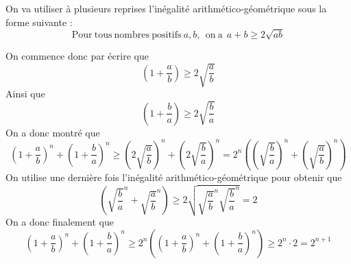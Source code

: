 \begin{sol}
On va utiliser à plusieurs reprises l'inégalité arithmético-géométrique sous la forme suivante :
$$\mathrm{Pour}\: \mathrm{tous}\: \mathrm{nombres}\: \mathrm{ positifs }\:a,b,\:\: \mathrm{on}\: \mathrm{a}\:\:a+b\ge 2\sqrt{ab} $$

On commence donc par écrire que
$$\left(1+\frac a b\right)\ge 2\sqrt{\frac a b} $$
Ainsi que
$$\left(1+\frac b a\right)\ge 2\sqrt{\frac b a} $$
On a donc montré que
$$\left(1+\frac a b\right)^n+\left(1+\frac b a\right)^n\ge \left(2\sqrt{\frac a b}\right)^n+\left(2\sqrt{\frac b a}\right)^n=2^n\left(\left(\sqrt{\frac b a}\right)^n+\left(\sqrt{\frac a b}\right)^n \right) $$
On utilise une dernière fois l'inégalité arithmético-géométrique pour obtenir que
$$\left(\sqrt{\frac b a}^n + \sqrt{\frac a b}^n\right) \ge 2 \sqrt{\sqrt{\frac a b}^n\sqrt{\frac b a}^n} = 2 $$
On a donc finalement que
$$\left(1+\frac a b\right)^n+\left(1+\frac b a\right)^n \ge 2^n \left(\left(1+\frac a b\right)^n + \left(1+\frac b a\right)^n\right) \ge2^n\cdot 2=2^{n+1} $$
\end{sol}


